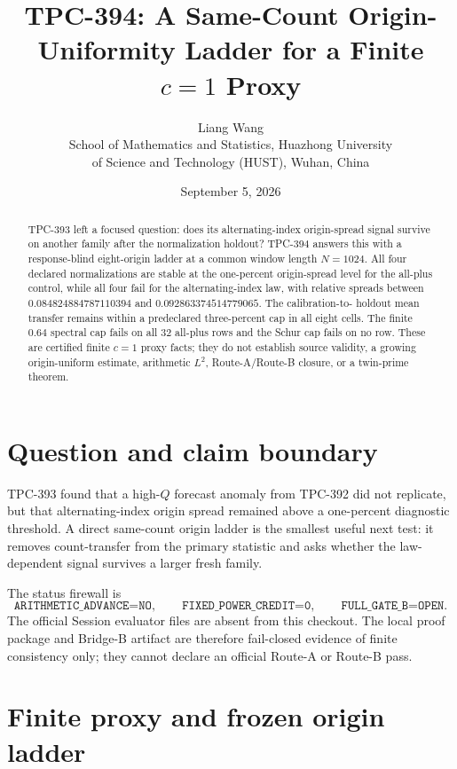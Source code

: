 \documentclass[10pt]{article}
\title{TPC-394: A Same-Count Origin-Uniformity Ladder for a Finite $c=1$ Proxy}
\author{Liang Wang\\
School of Mathematics and Statistics, Huazhong University\\
of Science and Technology (HUST), Wuhan, China}
\date{September 5, 2026}
\begin{document}
\maketitle

\begin{abstract}
TPC-393 left a focused question: does its alternating-index origin-spread
signal survive on another family after the normalization holdout?  TPC-394
answers this with a response-blind eight-origin ladder at a common window
length $N=1024$.  All four declared normalizations are stable at the
one-percent origin-spread level for the all-plus control, while all four fail
for the alternating-index law, with relative spreads between
$0.084824884787110394$ and $0.092863374514779065$.  The calibration-to-
holdout mean transfer remains within a predeclared three-percent cap in all
eight cells.  The finite $0.64$ spectral cap fails on all 32 all-plus rows and
the Schur cap fails on no row.  These are certified finite $c=1$ proxy facts;
they do not establish source validity, a growing origin-uniform estimate,
arithmetic $L^2$, Route-A/Route-B closure, or a twin-prime theorem.
\end{abstract}

\section{Question and claim boundary}

TPC-393 found that a high-$Q$ forecast anomaly from TPC-392 did not replicate,
but that alternating-index origin spread remained above a one-percent
diagnostic threshold.  A direct same-count origin ladder is the smallest
useful next test: it removes count-transfer from the primary statistic and
asks whether the law-dependent signal survives a larger fresh family.

The status firewall is
\[
 \texttt{ARITHMETIC\_ADVANCE=NO},\qquad
 \texttt{FIXED\_POWER\_CREDIT=0},\qquad
 \texttt{FULL\_GATE\_B=OPEN}.
\]
The official Session evaluator files are absent from this checkout.  The
local proof package and Bridge-B artifact are therefore fail-closed evidence
of finite consistency only; they cannot declare an official Route-A or
Route-B pass.

\section{Finite proxy and frozen origin ladder}
\end{document}
